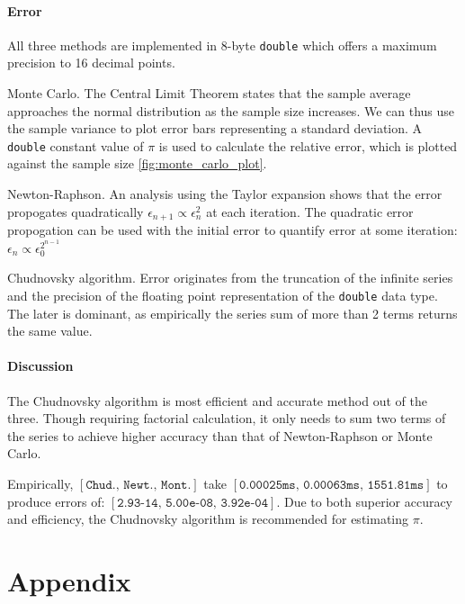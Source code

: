 \documentclass[11pt]{article}
\begin{document}
\paragraph{Error}
All three methods are implemented in 8-byte \texttt{double} which offers a maximum precision to
16 decimal points.
\par{Monte Carlo.} The Central Limit Theorem states that the sample average approaches the normal distribution as
the sample size increases. We can thus use the sample variance to plot error bars representing
a standard deviation. A \texttt{double} constant value of $\pi$ is used to calculate the relative error, which is
plotted against the sample size \ref{fig:monte_carlo_plot}.
\par{Newton-Raphson.} An analysis using the Taylor expansion shows that the error propogates quadratically $\epsilon_{n+1}\propto \epsilon_n^2$
at each iteration. The quadratic error propogation can be used with the initial error to quantify error at some iteration: $\epsilon_{n} \propto \epsilon_{0}^{2^{n-1}}$
\par{Chudnovsky algorithm.} Error originates from the truncation of the infinite series and the precision of the floating point 
representation of the \texttt{double} data type. The later is dominant, as empirically the series sum of more than 2 terms
returns the same value.

\paragraph{Discussion} The Chudnovsky algorithm is most efficient and accurate method out of the three. Though requiring 
factorial calculation, it only needs to sum two terms of the series to achieve
higher accuracy than that of Newton-Raphson or Monte Carlo.
\par Empirically, $[\texttt{Chud., Newt., Mont.}]$
take $[\texttt{0.00025ms, 0.00063ms, 1551.81ms}]$ to produce errors of: $[\texttt{2.93-14, 5.00e-08, 3.92e-04}]$.
Due to both superior accuracy and efficiency, the Chudnovsky algorithm is recommended for estimating $\pi$.
\newpage
\section*{Appendix}
\end{document}

